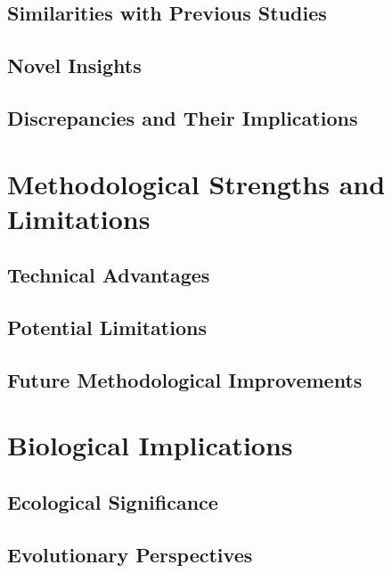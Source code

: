\documentclass[
  11pt,
  a4paper,
]{report}
\begin{document}
\subsection{Similarities with Previous
Studies}\label{similarities-with-previous-studies}

\subsection{Novel Insights}\label{novel-insights}

\subsection{Discrepancies and Their
Implications}\label{discrepancies-and-their-implications}

\section{Methodological Strengths and
Limitations}\label{methodological-strengths-and-limitations}

\subsection{Technical Advantages}\label{technical-advantages}

\subsection{Potential Limitations}\label{potential-limitations}

\subsection{Future Methodological
Improvements}\label{future-methodological-improvements}

\section{Biological Implications}\label{biological-implications}

\subsection{Ecological Significance}\label{ecological-significance}

\subsection{Evolutionary Perspectives}\label{evolutionary-perspectives}
\end{document}
